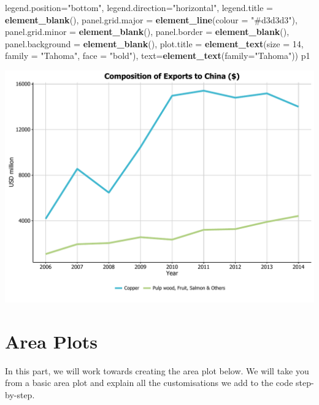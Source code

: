 \documentclass[]{article}
\newenvironment{Shaded}{\begin{snugshade}}{\end{snugshade}}
\newcommand{\KeywordTok}[1]{\textcolor[rgb]{0.13,0.29,0.53}{\textbf{{#1}}}}
\newcommand{\DataTypeTok}[1]{\textcolor[rgb]{0.13,0.29,0.53}{{#1}}}
\newcommand{\DecValTok}[1]{\textcolor[rgb]{0.00,0.00,0.81}{{#1}}}
\newcommand{\StringTok}[1]{\textcolor[rgb]{0.31,0.60,0.02}{{#1}}}
\newcommand{\NormalTok}[1]{{#1}}
\begin{document}
\begin{Shaded}
\begin{Highlighting}[]
        \DataTypeTok{legend.position=}\StringTok{"bottom"}\NormalTok{, }\DataTypeTok{legend.direction=}\StringTok{"horizontal"}\NormalTok{, }
        \DataTypeTok{legend.title =} \KeywordTok{element_blank}\NormalTok{(),}
        \DataTypeTok{panel.grid.major =} \KeywordTok{element_line}\NormalTok{(}\DataTypeTok{colour =} \StringTok{"#d3d3d3"}\NormalTok{), }
        \DataTypeTok{panel.grid.minor =} \KeywordTok{element_blank}\NormalTok{(), }
        \DataTypeTok{panel.border =} \KeywordTok{element_blank}\NormalTok{(), }
        \DataTypeTok{panel.background =} \KeywordTok{element_blank}\NormalTok{(),}
        \DataTypeTok{plot.title =} \KeywordTok{element_text}\NormalTok{(}\DataTypeTok{size =} \DecValTok{14}\NormalTok{, }\DataTypeTok{family =} \StringTok{"Tahoma"}\NormalTok{, }\DataTypeTok{face =} \StringTok{"bold"}\NormalTok{), }
        \DataTypeTok{text=}\KeywordTok{element_text}\NormalTok{(}\DataTypeTok{family=}\StringTok{"Tahoma"}\NormalTok{)) }
\NormalTok{p1}
\end{Highlighting}
\end{Shaded}

\begin{center}\includegraphics{0_all_posts_pdf/line_11-1} \end{center}

\section{Area Plots}\label{area-plots}

In this part, we will work towards creating the area plot below. We will
take you from a basic area plot and explain all the customisations we
add to the code step-by-step.
\end{document}
